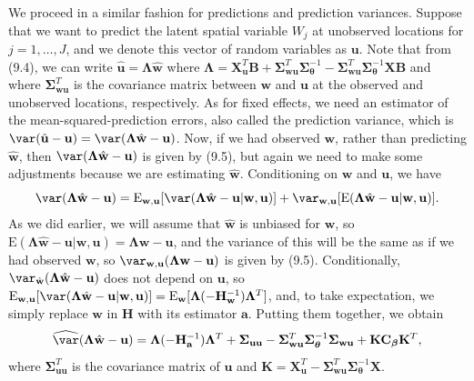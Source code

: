 \documentclass[12pt, titlepage]{article}
\begin{document}
We proceed in a similar fashion for predictions and prediction variances.  Suppose that we want to predict the latent spatial variable $W_{j}$ at unobserved locations for $j = 1, \ldots, J$, and we denote this vector of random variables as $\mathbf{u}$.  Note that from (9.4), we can write $\hat{\mathbf{u}} = \boldsymbol{\Lambda}\hat{\mathbf{w}}$ where $\boldsymbol{\Lambda} = \mathbf{X}^{T}_{\mathbf{u}}\mathbf{B} + \boldsymbol{\Sigma}^{T}_{\mathbf{w}\mathbf{u}}\boldsymbol{\Sigma}^{-1}_{\boldsymbol{\theta}} - \boldsymbol{\Sigma}^{T}_{\mathbf{w}\mathbf{u}}\boldsymbol{\Sigma}^{-1}_{\boldsymbol{\theta}}\mathbf{X}\mathbf{B}$ and where $\boldsymbol{\Sigma}^{T}_{\mathbf{w}\mathbf{u}}$ is the covariance matrix between $\mathbf{w}$ and $\mathbf{u}$ at the observed and unobserved locations, respectively. As for fixed effects, we need an estimator of the mean-squared-prediction errors, also called the prediction variance, which is $\var(\hat{\mathbf{u}} -\mathbf{u}) = \var(\boldsymbol{\Lambda}\hat{\mathbf{w}} - \mathbf{u})$.  Now, if we had observed $\mathbf{w}$, rather than predicting $\hat{\mathbf{w}}$, then $\var(\boldsymbol{\Lambda}\hat{\mathbf{w}} - \mathbf{u})$ is given by (9.5), but again we need to make some adjustments because we are estimating $\hat{\mathbf{w}}$.  Conditioning on $\mathbf{w}$ and $\mathbf{u}$, we have
$$
\var(\boldsymbol{\Lambda}\hat{\mathbf{w}}-\mathbf{u}) = \textrm{E}_{\mathbf{w},\mathbf{u}}[\var(\boldsymbol{\Lambda}\hat{\mathbf{w}} -\mathbf{u}|\mathbf{w},\mathbf{u})] + \var_{\mathbf{w},\mathbf{u}}[\textrm{E}(\boldsymbol{\Lambda}\hat{\mathbf{w}}-\mathbf{u}|\mathbf{w},\mathbf{u})].
$$
As we did earlier, we will assume that $\hat{\mathbf{w}}$ is unbiased for $\mathbf{w}$, so $\textrm{E}(\boldsymbol{\Lambda}\hat{\mathbf{w}}-\mathbf{u}|\mathbf{w},\mathbf{u}) = \boldsymbol{\Lambda}\mathbf{w}-\mathbf{u}$, and the variance of this will be the same as if we had observed $\mathbf{w}$, so $\var_{\mathbf{w},\mathbf{u}}(\boldsymbol{\Lambda}\mathbf{w}-\mathbf{u})$ is given by (9.5).  Conditionally, $\var_{\hat{\mathbf{w}}}(\boldsymbol{\Lambda}\hat{\mathbf{w}}-\mathbf{u})$ does not depend on $\mathbf{u}$, so $\textrm{E}_{\mathbf{w},\mathbf{u}}[\var(\boldsymbol{\Lambda}\hat{\mathbf{w}} -\mathbf{u}|\mathbf{w},\mathbf{u})] = \textrm{E}_{\mathbf{w}}[\boldsymbol{\Lambda}(-\mathbf{H}_{\mathbf{w}}^{-1})\boldsymbol{\Lambda}^{T}]$, and, to take expectation, we simply replace $\mathbf{w}$ in $\mathbf{H}$ with its estimator $\mathbf{a}$.  Putting them together, we obtain
\begin{equation} \label{eq:sglmm_varpred}
\widehat{\var}(\boldsymbol{\Lambda}\hat{\mathbf{w}}-\mathbf{u}) = \boldsymbol{\Lambda}(-\mathbf{H}_{\mathbf{a}}^{-1})\boldsymbol{\Lambda}^{T} + \boldsymbol{\Sigma}_{\mathbf{u}\mathbf{u}} - \boldsymbol{\Sigma}_{\mathbf{w}\mathbf{u}}^{T}\boldsymbol{\Sigma}_{\boldsymbol{\theta}}^{-1}\boldsymbol{\Sigma}_{\mathbf{w}\mathbf{u}} + \mathbf{K}\mathbf{C}_{\boldsymbol{\beta}}\mathbf{K}^{T},
\end{equation}
where $\boldsymbol{\Sigma}^{T}_{\mathbf{u}\mathbf{u}}$ is the covariance matrix of $\mathbf{u}$ and $\mathbf{K} = \mathbf{X}^{T}_{\mathbf{u}} - \boldsymbol{\Sigma}^{T}_{\mathbf{w}\mathbf{u}}\boldsymbol{\Sigma}^{-1}_{\boldsymbol{\theta}}\mathbf{X}$.
\end{document}

